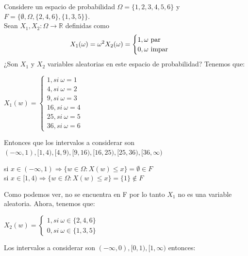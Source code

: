 \documentclass[12pt,a4paper]{report}
\begin{document}
\begin{enumerate}
{			
			
		
		\item {
			Considere un espacio de probabilidad $\Omega = \{1, 2, 3, 4, 5, 6\}$ y
			$F = \{\emptyset, \Omega, \{2, 4, 6\}, \{1, 3, 5\}\}$.\\
			Sean $X_1, X_2 : \Omega \rightarrow \mathbb{R}$ definidas como
			\begin{align*}
				X_1(\omega) = \omega^2 & X_2(\omega) = \begin{cases}
																								1, \omega $ par$\\
																								0, \omega $ impar$
																							\end{cases}
			\end{align*}
			¿Son $X_1$ y $X_2$ variables aleatorias en este espacio de probabilidad?
			Tenemos que: \\
			\begin{center}
			    $X_{1}(w)= \begin{cases} 1, si\ \omega=1\\ 4,si \ \omega=2 \\ 9, si \ \omega=3\\ 16, si \ \omega=4 \\ 25, si \ \omega=5 \\ 36, si \ \omega=6  \end{cases}$
			\end{center}
			Entonces que los intervalos a considerar son $(-\infty,1),[1,4),[4,9),[9,16),[16,25),[25,36),[36,\infty)$\\
			\begin{center}
			    si $x\in (-\infty,1) \Rightarrow \lbrace w\in \Omega : X(w)\leq x \rbrace = \emptyset \in F $ \\ 
			    si $x\in [1,4) \Rightarrow \lbrace w \in \Omega : X(w) \leq x \rbrace = \lbrace 1 \rbrace \notin F$
			\end{center}
			Como podemos ver, no se encuentra en F por lo tanto  $X_{1}$ no es una variable aleatoria. Ahora, tenemos que:\\
			\begin{center}
			    $X_{2}(w) = \begin{cases}
			    1, si \ \omega \in \lbrace 2,4,6 \rbrace \\
			    0, si \ \omega \in \lbrace 1,3,5 \rbrace 
			    \end{cases}$
			\end{center}
			}
			Los intervalos a considerar son $(-\infty,0),[0,1),[1,\infty)$ entonces:\\
}
\end{enumerate}
\end{document}
